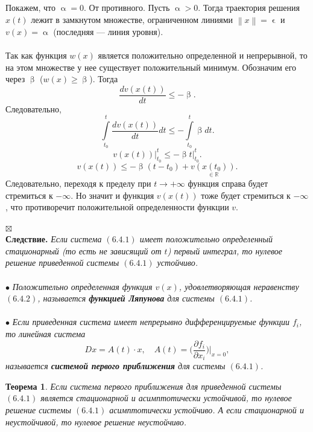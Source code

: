 \documentclass[a4paper, 12pt]{report}
\newenvironment{Proof} %
{\par\noindent{$\blacklozenge$}} %
{\hfill$\scriptstyle\boxtimes$}
\newcommand{\Rm}{\mathbb{R}}
\renewcommand{\leq}{\leqslant}
\renewcommand{\geq}{\geqslant}
\renewcommand{\alpha}{\upalpha}
\renewcommand{\beta}{\upbeta}
\renewcommand{\d}{\partial}
\renewcommand{\epsilon}{\upvarepsilon}
\newcommand\Norm[1]{\left\| #1 \right\|}
\newtheorem*{theorem}{Теорема}
\begin{document}
\begin{Proof}
\begin{enumerate}
		Покажем, что $\alpha = 0$. От противного. Пусть $\alpha > 0$. Тогда траектория решения $x(t)$ лежит в замкнутом множестве, ограниченном линиями $\Norm {x} = \epsilon$ и $v(x) = \alpha$ (последняя --- линия уровня). \\\\
		Так как функция $w(x)$ является положительно определенной и непрерывной, то на этом множестве у нее существует положительный минимум. Обозначим его через $\beta$ 
		($w(x) \geq \beta$). Тогда $$\dfrac{d v(x(t))}{dt}\leq - \beta.$$
		Следовательно, $$\int\limits_{t_0}^t \dfrac{d v(x(t))}{dt}dt \leq - \int\limits_{t_0}^t \beta dt.$$
		$$v(x(t))\Big|_{t_0}^t \leq -\beta t\Big|_{t_0}^t.$$
		$$v(x(t)) \leq -\beta (t-t_0) + \underset{\in \Rm}{v(x(t_0))}.$$
		Следовательно, переходя к пределу при $t \to +\infty$ функция справа будет стремиться к $-\infty$. Но значит и функция $v(x(t))$ тоже будет стремиться к $-\infty$, что противоречит положительной определенности функции $v$.
	\end{enumerate}
	\end{Proof}\\
	\textbf{Следствие.}
		\textit{Если система $(6.4.1)$ имеет положительно определенный стационарный (то есть не зависящий от $t$) первый интеграл, то нулевое решение приведенной системы $(6.4.1)$ устойчиво.}
	\\\\
	$\bullet$ \textit{Положительно определенная функция $v(x)$, удовлетворяющая неравенству $(6.4.2)$, называется \textbf{функцией Ляпунова} для системы $(6.4.1)$.}\\\\
	$\bullet$ \textit{Если приведенная система имеет непрерывно дифференцируемые функции $f_i$, то линейная система} $$Dx = A(t)\cdot x,\quad A(t) = \Big(\dfrac{\d f_i}{\d x_i}\Big)\Big|_{x= 0},$$
	\textit{называется \textbf{системой первого приближения} для системы $(6.4.1)$.}
	\begin{theorem}
		Если система первого приближения для приведенной системы $(6.4.1)$ является стационарной и асимптотически устойчивой, то нулевое решение системы $(6.4.1)$ асимптотически устойчиво. А если стационарной и неустойчивой, то нулевое решение неустойчиво.
	\end{theorem}
	
\end{document}
